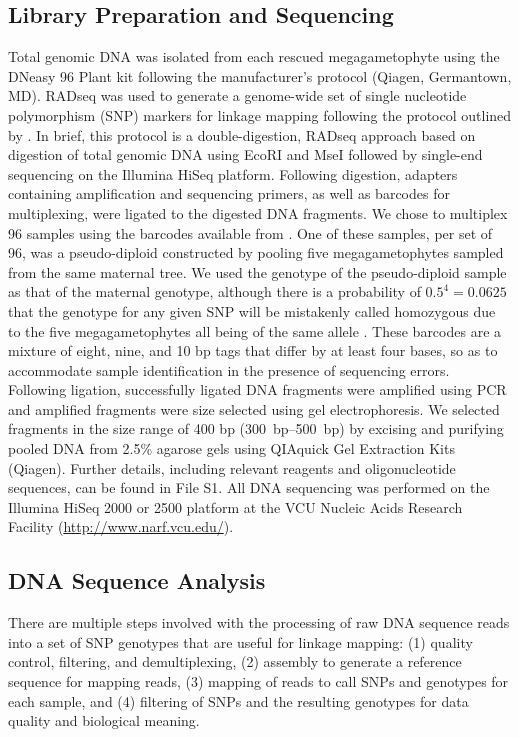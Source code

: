 \documentclass[11pt]{article}
\begin{document}
\subsection*{Library Preparation and Sequencing}
Total genomic DNA was isolated from each rescued megagametophyte using the DNeasy 96 Plant 
kit following the manufacturer’s protocol (Qiagen, Germantown, MD). RADseq \citep{Davey:2010, Parchman:2012, Peterson:2012} 
was used to generate a genome-wide set of 
single nucleotide polymorphism (SNP) markers for linkage mapping following the protocol 
outlined by \citet{Parchman:2012}. In brief, this protocol is a double-digestion, RADseq 
approach based on digestion of total genomic DNA using EcoRI and MseI followed by single-end 
sequencing on the Illumina HiSeq platform. Following digestion, adapters 
containing amplification and sequencing primers, as well as barcodes for multiplexing, 
were ligated to the digested DNA fragments. We chose to multiplex 96 samples using the 
barcodes available from \citet{Parchman:2012}. One of these samples, per set of 96, was a pseudo-diploid
constructed by pooling five megagametophytes sampled from the same maternal tree. We used the genotype of the
pseudo-diploid sample as that of the maternal genotype, although there is a probability of $0.5^{4} = 0.0625$ that 
the genotype for any given SNP will be mistakenly called homozygous due to the five megagametophytes all being of the 
same allele \citep[see][]{Morris:1978}.
These barcodes are a mixture of eight, nine, and  10 bp tags that differ by at least four bases, so as to accommodate
sample identification in the presence of sequencing errors. Following ligation, successfully ligated DNA fragments were 
amplified using PCR and amplified fragments were size selected using gel electrophoresis. We selected 
fragments in the size range of 400 bp (\SIrange{300}{500}{bp}) by excising and purifying pooled DNA from 2.5\% 
agarose gels using QIAquick Gel Extraction Kits (Qiagen). Further details, including relevant reagents and 
oligonucleotide sequences, can be found in File S1. All DNA sequencing was performed on the Illumina HiSeq 2000 or 2500
platform at the VCU Nucleic Acids Research Facility (\url{http://www.narf.vcu.edu/}).

\subsection*{DNA Sequence Analysis}\label{ss:dna}
There are multiple steps involved with the processing of raw DNA sequence reads into a set of SNP genotypes that are 
useful for linkage mapping: (1) quality control, filtering, and demultiplexing, (2) assembly to generate a reference 
sequence for mapping reads, (3) mapping of reads to call SNPs and genotypes for each sample, and (4) filtering of SNPs 
and the resulting genotypes for data quality and biological meaning.
\end{document}
